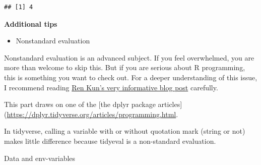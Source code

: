 \documentclass[
]{book}
\newenvironment{Shaded}{\begin{snugshade}}{\end{snugshade}}
\newcommand{\AttributeTok}[1]{\textcolor[rgb]{0.13,0.29,0.53}{#1}}
\newcommand{\CommentTok}[1]{\textcolor[rgb]{0.56,0.35,0.01}{\textit{#1}}}
\newcommand{\DecValTok}[1]{\textcolor[rgb]{0.00,0.00,0.81}{#1}}
\newcommand{\FunctionTok}[1]{\textcolor[rgb]{0.13,0.29,0.53}{\textbf{#1}}}
\newcommand{\NormalTok}[1]{#1}
\newcommand{\OtherTok}[1]{\textcolor[rgb]{0.56,0.35,0.01}{#1}}
\newcommand{\SpecialCharTok}[1]{\textcolor[rgb]{0.81,0.36,0.00}{\textbf{#1}}}
\newcommand{\StringTok}[1]{\textcolor[rgb]{0.31,0.60,0.02}{#1}}
\providecommand{\tightlist}{%
  \setlength{\itemsep}{0pt}\setlength{\parskip}{0pt}}
\begin{document}
\begin{verbatim}
## [1] 4
\end{verbatim}

\textbf{Additional tips}

\begin{itemize}
\tightlist
\item
  Nonstandard evaluation
\end{itemize}

Nonstandard evaluation is an advanced subject. If you feel overwhelmed, you are more than welcome to skip this. But if you are serious about R programming, this is something you want to check out. For a deeper understanding of this issue, I recommend reading \href{https://renkun.me/2014/12/03/tips-on-non-standard-evaluation-in-r/}{Ren Kun's very informative blog post} carefully.

This part draws on one of the {[}the dplyr package articles{]}(\url{https://dplyr.tidyverse.org/articles/programming.html}.

In tidyverse, calling a variable with or without quotation mark (string or not) makes little difference because tidyeval is a non-standard evaluation.

\begin{Shaded}
\end{Shaded}

Data and env-variables

\begin{Shaded}
\end{Shaded}
\end{document}
